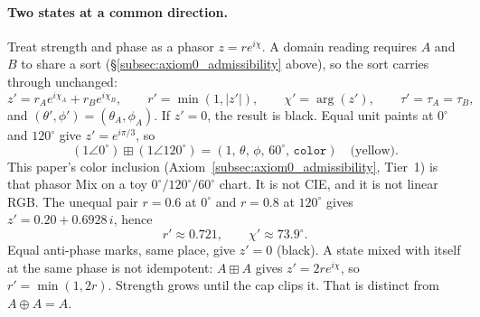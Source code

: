 \documentclass[12pt, a4paper]{article}
\begin{document}
\paragraph{Two states at a common direction.}
Treat strength and phase as a phasor $z=r e^{i\chi}$. A domain reading
requires $A$ and $B$ to share a sort (\S\ref{subsec:axiom0_admissibility}
above), so the sort carries through unchanged:
\begin{equation}
    z' = r_A e^{i\chi_A} + r_B e^{i\chi_B},
    \qquad
    r' = \min(1,|z'|),
    \qquad
    \chi' = \arg(z'),
    \qquad
    \tau' = \tau_A = \tau_B,
    \label{eq:interference_formal}
\end{equation}
and $(\theta',\phi')=(\theta_A,\phi_A)$. If $z'=0$, the result is
black. Equal unit paints at $0^\circ$ and $120^\circ$ give
$z'=e^{i\pi/3}$, so
\[
(1\angle 0^\circ)\boxplus(1\angle 120^\circ)
=(1,\,\theta,\,\phi,\,60^\circ,\,\mathtt{color})
\quad\text{(yellow)}.
\]
This paper's color inclusion
(Axiom~\ref{subsec:axiom0_admissibility}, Tier~1) is that phasor Mix
on a toy $0^\circ/120^\circ/60^\circ$ chart. It is not CIE, and it is
not linear RGB.
The unequal pair $r=0.6$ at $0^\circ$ and $r=0.8$ at $120^\circ$
gives $z'=0.20+0.6928\,i$, hence
\[
r'\approx 0.721,\qquad \chi'\approx 73.9^\circ.
\]
Equal anti-phase marks, same place, give $z'=0$ (black).
A state mixed with itself at the same phase is not idempotent:
$A\boxplus A$ gives $z'=2r e^{i\chi}$, so $r'=\min(1,2r)$.
Strength grows until the cap clips it. That is distinct from
$A\oplus A=A$.
\end{document}
